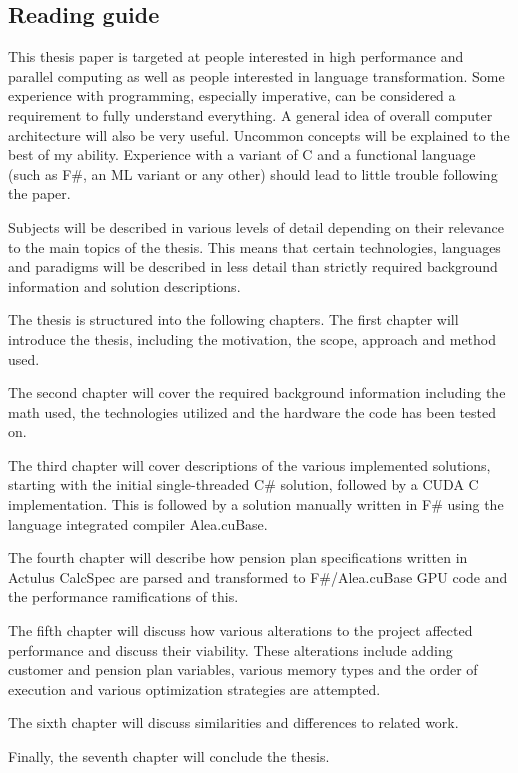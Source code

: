 \subsection{Reading guide}
This thesis paper is targeted at people interested in high performance and parallel computing as well as people interested in language transformation. Some experience with programming, especially imperative, can be considered a requirement to fully understand everything. A general idea of overall computer architecture will also be very useful. Uncommon concepts will be explained to the best of my ability. Experience with a variant of C and a functional language (such as F\#, an ML variant or any other) should lead to little trouble following the paper.

Subjects will be described in various levels of detail depending on their relevance to the main topics of the thesis.
This means that certain technologies, languages and paradigms will be described in less detail than strictly required background information and solution descriptions.

The thesis is structured into the following chapters.
The first chapter will introduce the thesis, including the motivation, the scope, approach and method used.

The second chapter will cover the required background information including the math used, the technologies utilized and the hardware the code has been tested on.

The third chapter will cover descriptions of the various implemented solutions, starting with the initial single-threaded C\# solution, followed by a CUDA C implementation. This is followed by a solution manually written in F\# using the language integrated compiler Alea.cuBase.

The fourth chapter will describe how pension plan specifications written in Actulus CalcSpec are parsed and transformed to F\#/Alea.cuBase GPU code and the performance ramifications of this.

The fifth chapter will discuss how various alterations to the project affected performance and discuss their viability. These alterations include adding customer and pension plan variables, various memory types and the order of execution and various optimization strategies are attempted.

The sixth chapter will discuss similarities and differences to related work.

Finally, the seventh chapter will conclude the thesis.
